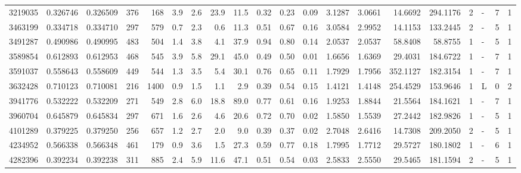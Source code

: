 \begin{center}
\begin{tabular}{rccrrccrrrrrrrrrrlrr}
   3219035 & 0.326746 & 0.326509 &  376 &  168 &      3.9 &      2.6 &    23.9 &    11.5 &   0.32 &   0.23 &       0.09 &  3.1287 &  3.0661 &   14.6692 &  294.1176 &       2 &             - &        7 &         1 \\
   3463199 & 0.334718 & 0.334710 &  297 &  579 &      0.7 &      2.3 &     0.6 &    11.3 &   0.51 &   0.67 &       0.16 &  3.0584 &  2.9952 &   14.1153 &  133.2445 &       2 &             - &        5 &         1 \\
   3491287 & 0.490986 & 0.490995 &  483 &  504 &      1.4 &      3.8 &     4.1 &    37.9 &   0.94 &   0.80 &       0.14 &  2.0537 &  2.0537 &   58.8408 &   58.8755 &       1 &             - &        5 &         1 \\
   3589854 & 0.612893 & 0.612953 &  468 &  545 &      3.9 &      5.8 &    29.1 &    45.0 &   0.49 &   0.50 &       0.01 &  1.6656 &  1.6369 &   29.4031 &  184.6722 &       1 &             - &        7 &         1 \\
   3591037 & 0.558643 & 0.558609 &  449 &  544 &      1.3 &      3.5 &     5.4 &    30.1 &   0.76 &   0.65 &       0.11 &  1.7929 &  1.7956 &  352.1127 &  182.3154 &       1 &             - &        7 &         1 \\
   3632428 & 0.710123 & 0.710081 &  216 & 1400 &      0.9 &      1.5 &     1.1 &     2.9 &   0.39 &   0.54 &       0.15 &  1.4121 &  1.4148 &  254.4529 &  153.9646 &       1 &             L &        0 &         2 \\
   3941776 & 0.532222 & 0.532209 &  271 &  549 &      2.8 &      6.0 &    18.8 &    89.0 &   0.77 &   0.61 &       0.16 &  1.9253 &  1.8844 &   21.5564 &  184.1621 &       1 &             - &        7 &         1 \\
   3960704 & 0.645879 & 0.645834 &  297 &  671 &      1.6 &      2.6 &     4.6 &    20.6 &   0.72 &   0.70 &       0.02 &  1.5850 &  1.5539 &   27.2442 &  182.9826 &       1 &             - &        5 &         1 \\
   4101289 & 0.379225 & 0.379250 &  256 &  657 &      1.2 &      2.7 &     2.0 &     9.0 &   0.39 &   0.37 &       0.02 &  2.7048 &  2.6416 &   14.7308 &  209.2050 &       2 &             - &        5 &         1 \\
   4234952 & 0.566338 & 0.566348 &  461 &  179 &      0.9 &      3.6 &     1.5 &    27.3 &   0.59 &   0.77 &       0.18 &  1.7995 &  1.7712 &   29.5727 &  180.1802 &       1 &             - &        6 &         1 \\
   4282396 & 0.392234 & 0.392238 &  311 &  885 &      2.4 &      5.9 &    11.6 &    47.1 &   0.51 &   0.54 &       0.03 &  2.5833 &  2.5550 &   29.5465 &  181.1594 &       2 &             - &        5 &         1 \\

\end{tabular}
\end{center}
